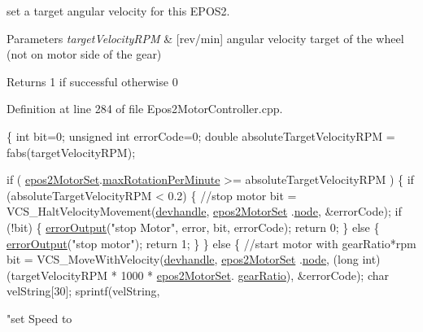 set a target angular velocity for this E\-P\-O\-S2. 


\begin{DoxyParams}{Parameters}
{\em target\-Velocity\-R\-P\-M} & \mbox{[}rev/min\mbox{]} angular velocity target of the wheel (not on motor side of the gear) \\
\hline
\end{DoxyParams}
\begin{DoxyReturn}{Returns}
1 if successful otherwise 0 
\end{DoxyReturn}


Definition at line 284 of file Epos2\-Motor\-Controller.\-cpp.


\begin{DoxyCode}
\{
    \textcolor{keywordtype}{int} bit=0;
    \textcolor{keywordtype}{unsigned} \textcolor{keywordtype}{int} errorCode=0;
    \textcolor{keywordtype}{double} absoluteTargetVelocityRPM = fabs(targetVelocityRPM);

    \textcolor{keywordflow}{if} ( \hyperlink{classEpos2MotorController_a0856f5fdd71ffa3b84a536afa085bfb1}{epos2MotorSet}.\hyperlink{structEpos2MotorController_1_1epos2Settings_a7bc89f766fbe9abcb503572714422658}{maxRotationPerMinute} >=
       absoluteTargetVelocityRPM ) \{
        \textcolor{keywordflow}{if} (absoluteTargetVelocityRPM < 0.2) \{  \textcolor{comment}{//stop motor}
            bit = VCS\_HaltVelocityMovement(\hyperlink{classEpos2MotorController_a40594faab444bcba221ab9d55d1162cd}{devhandle}, \hyperlink{classEpos2MotorController_a0856f5fdd71ffa3b84a536afa085bfb1}{epos2MotorSet}
      .\hyperlink{structEpos2MotorController_1_1epos2Settings_ab8f18d3df17e8de9ed5250a3e53292c6}{node}, &errorCode);
            \textcolor{keywordflow}{if} (!bit) \{
                \hyperlink{classEpos2MotorController_a64d5e3e3858597c111e60ba8b382a63b}{errorOutput}(\textcolor{stringliteral}{"stop Motor"}, error, bit, errorCode);
                \textcolor{keywordflow}{return} 0;
            \} \textcolor{keywordflow}{else} \{
                \hyperlink{classEpos2MotorController_a64d5e3e3858597c111e60ba8b382a63b}{errorOutput}(\textcolor{stringliteral}{"stop motor"});
                \textcolor{keywordflow}{return} 1;
            \}
        \} \textcolor{keywordflow}{else} \{    \textcolor{comment}{//start motor with gearRatio*rpm}
            bit = VCS\_MoveWithVelocity(\hyperlink{classEpos2MotorController_a40594faab444bcba221ab9d55d1162cd}{devhandle}, \hyperlink{classEpos2MotorController_a0856f5fdd71ffa3b84a536afa085bfb1}{epos2MotorSet}
      .\hyperlink{structEpos2MotorController_1_1epos2Settings_ab8f18d3df17e8de9ed5250a3e53292c6}{node}, (\textcolor{keywordtype}{long} \textcolor{keywordtype}{int}) (targetVelocityRPM * 1000 * \hyperlink{classEpos2MotorController_a0856f5fdd71ffa3b84a536afa085bfb1}{epos2MotorSet}.
      \hyperlink{structEpos2MotorController_1_1epos2Settings_adf387ce695bf432caace5e216dda3429}{gearRatio}), &errorCode);
            \textcolor{keywordtype}{char} velString[30];
            sprintf(velString, \textcolor{stringliteral}{"set Speed to %

}
\end{DoxyCode}
